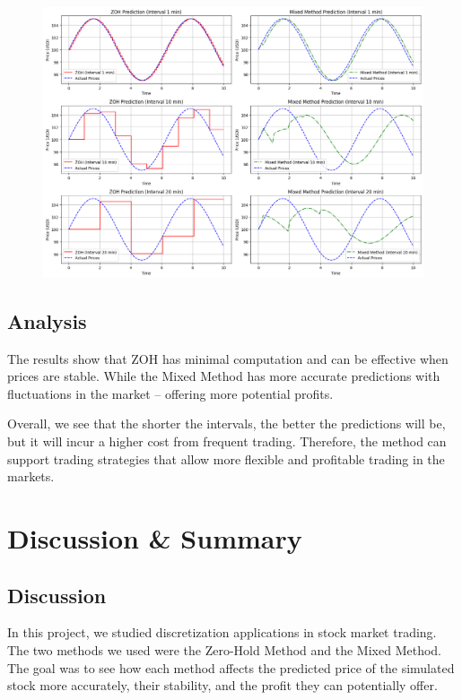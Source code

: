 \documentclass{article}
\begin{document}
\begin{figure}
    \centering
    \includegraphics[width=1\linewidth]{zoh_mm.png}
    \label{fig:zohmm2}
\end{figure}

\subsection{Analysis}
The results show that ZOH has minimal computation and can be effective when prices are stable. While the Mixed Method has more accurate predictions with fluctuations in the market – offering more potential profits. 

Overall, we see that the shorter the intervals, the better the predictions will be, but it will incur a higher cost from frequent trading. Therefore, the method can support trading strategies that allow more flexible and profitable trading in the markets.


\section{Discussion \& Summary}

\subsection{Discussion}
In this project, we studied discretization applications in stock market trading. The two methods we used were the Zero-Hold Method and the Mixed Method. The goal was to see how each method affects the predicted price of the simulated stock more accurately, their stability, and the profit they can potentially offer. 
\end{document}
